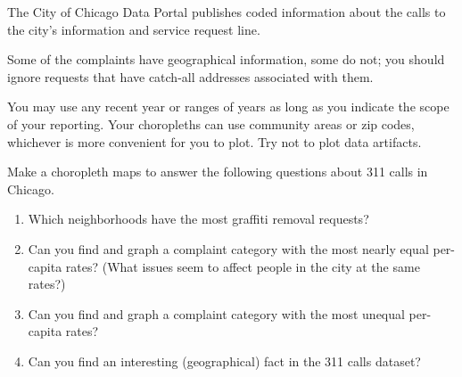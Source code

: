 \documentclass[]{book}
\theoremstyle{definition}
\newtheorem*{soln}{Solution}
\begin{document}
\begin{enumerate}
The City of Chicago Data Portal publishes coded information about the calls to the city's information  and service request line.

Some of the complaints have geographical information, some do not; you should ignore requests that have catch-all addresses associated with them.

You may use any recent year or ranges of years as long as you indicate the scope of your reporting.  Your choropleths can use community areas or zip codes, whichever is more convenient for you to plot.  Try not to plot data artifacts.

Make a choropleth maps to answer the following questions about 311 calls in Chicago.  
\begin{enumerate}
\item  Which neighborhoods have the most graffiti removal requests?  
\item  Can you find and graph a complaint category with the most nearly equal per-capita rates?  (What issues seem to affect people in the city at the same rates?)
\item  Can you find and graph a complaint category with the most unequal per-capita rates? 
\item  Can you find an interesting (geographical) fact in the 311 calls dataset?

\end{enumerate}


\end{enumerate}
\end{document}
